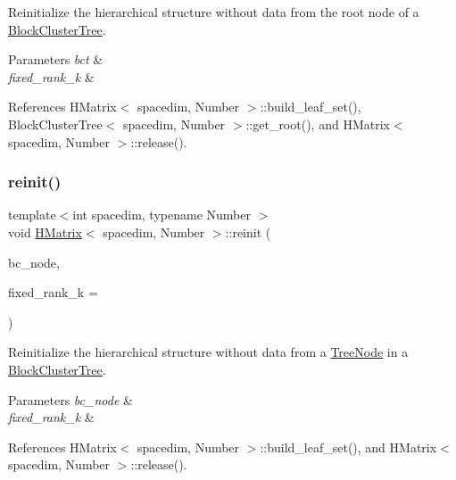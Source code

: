 Reinitialize the hierarchical structure without data from the root node of a \hyperlink{classBlockClusterTree}{Block\+Cluster\+Tree}. 
\begin{DoxyParams}{Parameters}
{\em bct} & \\
\hline
{\em fixed\+\_\+rank\+\_\+k} & \\
\hline
\end{DoxyParams}


References H\+Matrix$<$ spacedim, Number $>$\+::build\+\_\+leaf\+\_\+set(), Block\+Cluster\+Tree$<$ spacedim, Number $>$\+::get\+\_\+root(), and H\+Matrix$<$ spacedim, Number $>$\+::release().

\mbox{\label{classHMatrix_a41d20c1839f3d7a756107b8e4defea0b}} 
\subsubsection{\texorpdfstring{reinit()}{reinit()}\hspace{0.1cm}{\footnotesize\ttfamily [2/2]}}
{\footnotesize\ttfamily template$<$int spacedim, typename Number $>$ \\
void \hyperlink{classHMatrix}{H\+Matrix}$<$ spacedim, Number $>$\+::reinit (\begin{DoxyParamCaption}\item[{typename \hyperlink{classBlockClusterTree}{Block\+Cluster\+Tree}$<$ spacedim, Number $>$\+::node\+\_\+const\+\_\+pointer\+\_\+type}]{bc\+\_\+node,  }\item[{const unsigned int}]{fixed\+\_\+rank\+\_\+k = {} }\end{DoxyParamCaption})}

Reinitialize the hierarchical structure without data from a \hyperlink{classTreeNode}{Tree\+Node} in a \hyperlink{classBlockClusterTree}{Block\+Cluster\+Tree}. 
\begin{DoxyParams}{Parameters}
{\em bc\+\_\+node} & \\
\hline
{\em fixed\+\_\+rank\+\_\+k} & \\
\hline
\end{DoxyParams}


References H\+Matrix$<$ spacedim, Number $>$\+::build\+\_\+leaf\+\_\+set(), and H\+Matrix$<$ spacedim, Number $>$\+::release().

\mbox{\label{classHMatrix_a812e8276888b2ad866edf7ce9b286839}} 

